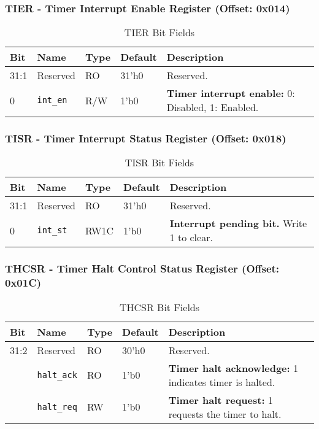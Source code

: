 \documentclass[11pt, a4paper]{article}
\begin{document}
\subsubsection{TIER - Timer Interrupt Enable Register (Offset: 0x014)}
\begin{table}[H]
    \centering
    \caption{TIER Bit Fields}
    \begin{tabular}{@{}lllll@{}}
        \toprule
        \textbf{Bit} & \textbf{Name} & \textbf{Type} & \textbf{Default} & \textbf{Description} \\ \midrule
        31:1 & Reserved & RO & 31'h0 & Reserved. \\
        0 & \texttt{int\_en} & R/W & 1'b0 & \textbf{Timer interrupt enable:} 0: Disabled, 1: Enabled. \\ \bottomrule
    \end{tabular}
\end{table}

\subsubsection{TISR - Timer Interrupt Status Register (Offset: 0x018)}
\begin{table}[H]
    \centering
    \caption{TISR Bit Fields}
    \begin{tabular}{@{}lllll@{}}
        \toprule
        \textbf{Bit} & \textbf{Name} & \textbf{Type} & \textbf{Default} & \textbf{Description} \\ \midrule
        31:1 & Reserved & RO & 31'h0 & Reserved. \\
        0 & \texttt{int\_st} & RW1C & 1'b0 & \textbf{Interrupt pending bit.} Write 1 to clear. \\ \bottomrule
    \end{tabular}
\end{table}

\subsubsection{THCSR - Timer Halt Control Status Register (Offset: 0x01C)}
\begin{table}[H]
    \centering
    \caption{THCSR Bit Fields}
    \begin{tabular}{@{}lllll@{}}
        \toprule
        \textbf{Bit} & \textbf{Name} & \textbf{Type} & \textbf{Default} & \textbf{Description} \\ \midrule
        31:2 & Reserved & RO & 30'h0 & Reserved. \\ \addlinespace
        1 & \texttt{halt\_ack} & RO & 1'b0 & \textbf{Timer halt acknowledge:} 1 indicates timer is halted. \\ \addlinespace
        0 & \texttt{halt\_req} & RW & 1'b0 & \textbf{Timer halt request:} 1 requests the timer to halt. \\ \bottomrule
    \end{tabular}
\end{table}
\end{document}
